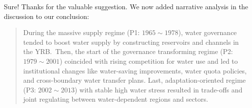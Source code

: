 \AR{} Sure! Thanks for the valuable suggestion. We now added narrative analysis in the discussion to our conclusion:

\begin{quote}
    During the massive supply regime (P1: $1965 \sim 1978$), water governance tended to boost water supply by constructing reservoirs and channels in the YRB.\
    Then, the start of the governance transforming regime (P2: $1979 \sim 2001$) coincided with rising competition for water use and led to institutional changes like water-saving improvements, water quota policies, and cross-boundary water transfer plans.
    Last, adaptation-oriented regime (P3: $2002 \sim 2013$) with stable high water stress resulted in trade-offs and joint regulating between water-dependent regions and sectors.
\end{quote}
